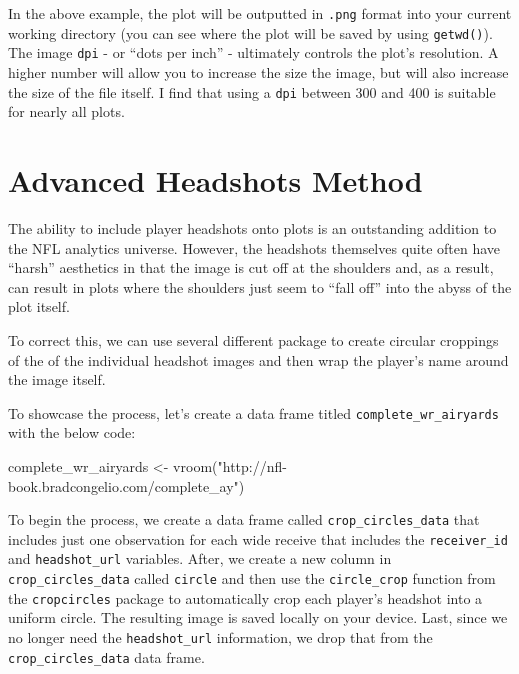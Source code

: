 \documentclass[
  letterpaper,
]{krantz}
\newenvironment{Shaded}{\begin{snugshade}}{\end{snugshade}}
\newcommand{\FunctionTok}[1]{\textcolor[rgb]{0.28,0.35,0.67}{#1}}
\newcommand{\NormalTok}[1]{\textcolor[rgb]{0.00,0.23,0.31}{#1}}
\newcommand{\OtherTok}[1]{\textcolor[rgb]{0.00,0.23,0.31}{#1}}
\newcommand{\StringTok}[1]{\textcolor[rgb]{0.13,0.47,0.30}{#1}}
\begin{document}
In the above example, the plot will be outputted in \texttt{.png} format
into your current working directory (you can see where the plot will be
saved by using \texttt{getwd()}). The image \texttt{dpi} - or ``dots per
inch'' - ultimately controls the plot's resolution. A higher number will
allow you to increase the size the image, but will also increase the
size of the file itself. I find that using a \texttt{dpi} between 300
and 400 is suitable for nearly all plots.

\hypertarget{advanced-headshots-method}{%
\section{Advanced Headshots Method}\label{advanced-headshots-method}}

The ability to include player headshots onto plots is an outstanding
addition to the NFL analytics universe. However, the headshots
themselves quite often have ``harsh'' aesthetics in that the image is
cut off at the shoulders and, as a result, can result in plots where the
shoulders just seem to ``fall off'' into the abyss of the plot itself.

To correct this, we can use several different package to create circular
croppings of the of the individual headshot images and then wrap the
player's name around the image itself.

To showcase the process, let's create a data frame titled
\texttt{complete\_wr\_airyards} with the below code:

\begin{Shaded}
\begin{Highlighting}[]
\NormalTok{complete\_wr\_airyards }\OtherTok{\textless{}{-}} \FunctionTok{vroom}\NormalTok{(}\StringTok{"http://nfl{-}book.bradcongelio.com/complete\_ay"}\NormalTok{)}
\end{Highlighting}
\end{Shaded}

To begin the process, we create a data frame called
\texttt{crop\_circles\_data} that includes just one observation for each
wide receive that includes the \texttt{receiver\_id} and
\texttt{headshot\_url} variables. After, we create a new column in
\texttt{crop\_circles\_data} called \texttt{circle} and then use the
\texttt{circle\_crop} function from the \texttt{cropcircles} package to
automatically crop each player's headshot into a uniform circle. The
resulting image is saved locally on your device. Last, since we no
longer need the \texttt{headshot\_url} information, we drop that from
the \texttt{crop\_circles\_data} data frame.
\end{document}
